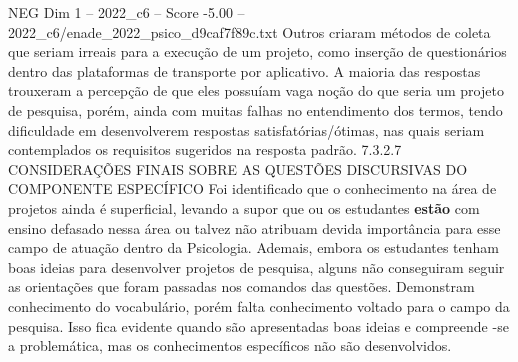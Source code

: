 \begin{textsample}{NEG Dim 1 – 2022\_c6 – Score -5.00 – 2022\_c6/enade\_2022\_psico\_d9caf7f89c.txt}
Outros criaram métodos de coleta que seriam irreais para a execução de um projeto, como inserção de questionários dentro das plataformas de transporte por aplicativo.
A maioria das respostas trouxeram a percepção de que eles possuíam vaga noção do que seria um projeto de pesquisa, porém, ainda com muitas falhas no entendimento dos termos, tendo dificuldade em desenvolverem respostas satisfatórias/ótimas, nas quais seriam contemplados os requisitos sugeridos na resposta padrão. 7.3.2.7 CONSIDERAÇÕES FINAIS SOBRE AS QUESTÕES DISCURSIVAS DO COMPONENTE ESPECÍFICO Foi identificado que o conhecimento na área de projetos ainda é superficial, levando a supor que ou os estudantes \textbf{estão} com ensino defasado nessa área ou talvez não atribuam devida importância para esse campo de atuação dentro da Psicologia.
Ademais, embora os estudantes tenham boas ideias para desenvolver projetos de pesquisa, alguns não conseguiram seguir as orientações que foram passadas nos comandos das questões.
Demonstram conhecimento do vocabulário, porém falta conhecimento voltado para o campo da pesquisa.
Isso fica evidente quando são apresentadas boas ideias e compreende -se a problemática, mas os conhecimentos específicos não são desenvolvidos.

\end{textsample}
